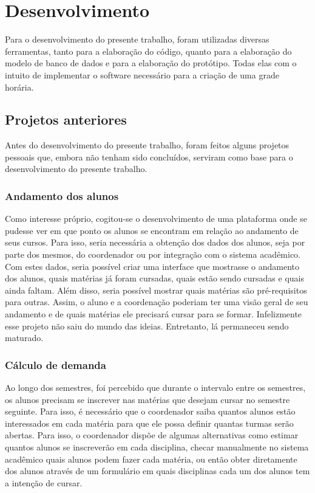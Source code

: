 \chapter{Desenvolvimento} %

Para o desenvolvimento do presente trabalho, foram utilizadas diversas ferramentas, tanto para a elaboração do código, quanto para a elaboração do modelo de banco de dados e para a elaboração do protótipo. Todas elas com o intuito de implementar o software necessário para a criação de uma grade horária.

\section{Projetos anteriores} %

    Antes do desenvolvimento do presente trabalho, foram feitos alguns projetos pessoais que, embora não tenham sido concluídos, serviram como base para o desenvolvimento do presente trabalho.

    \subsection{Andamento dos alunos} %

        Como interesse próprio, cogitou-se o desenvolvimento de uma plataforma onde se pudesse ver em que ponto os alunos se encontram em relação ao andamento de seus cursos. Para isso, seria necessária a obtenção dos dados dos alunos, seja por parte dos mesmos, do coordenador ou por integração com o sistema acadêmico. Com estes dados, seria possível criar uma interface que mostrasse o andamento dos alunos, quais matérias já foram cursadas, quais estão sendo cursadas e quais ainda faltam. Além disso, seria possível mostrar quais matérias são pré-requisitos para outras. Assim, o aluno e a coordenação poderiam ter uma visão geral de seu andamento e de quais matérias ele precisará cursar para se formar. Infelizmente esse projeto não saiu do mundo das ideias. Entretanto, lá permaneceu sendo maturado.

    \subsection{Cálculo de demanda} %

        Ao longo dos semestres, foi percebido que durante o intervalo entre os semestres, os alunos precisam se inscrever nas matérias que desejam cursar no semestre seguinte. Para isso, é necessário que o coordenador saiba quantos alunos estão interessados em cada matéria para que ele possa definir quantas turmas serão abertas. Para isso, o coordenador dispõe de algumas alternativas como estimar quantos alunos se inscreverão em cada disciplina, checar manualmente no sistema acadêmico quais alunos podem fazer cada matéria, ou então obter diretamente dos alunos através de um formulário em quais disciplinas cada um dos alunos tem a intenção de cursar.

